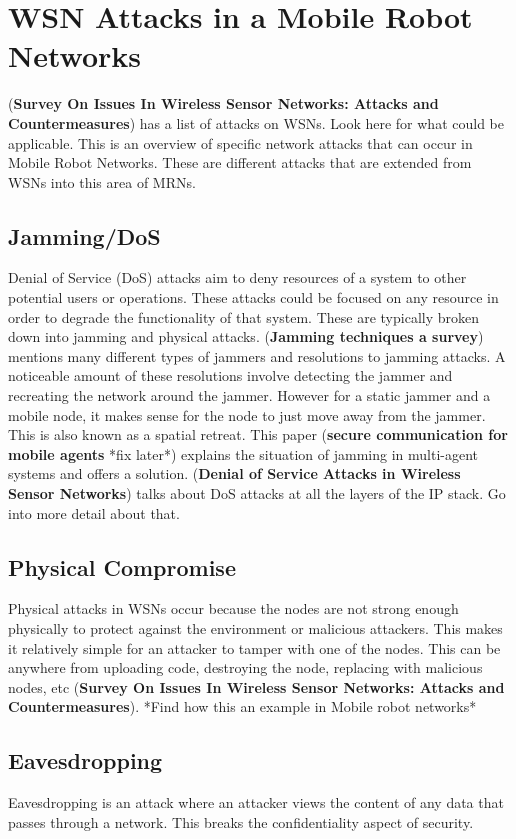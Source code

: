 \section{WSN Attacks in a Mobile Robot Networks}
(\textbf{Survey On Issues In Wireless Sensor Networks: Attacks and Countermeasures}) has a list of attacks on WSNs. Look here for what could be applicable. \newline
This is an overview of specific network attacks that can occur in Mobile Robot Networks. These are different attacks that are extended from WSNs into this area of MRNs.  
\subsection{Jamming/DoS}
Denial of Service (DoS) attacks aim to deny resources of a system to other potential users or operations. These attacks could be focused on any resource in order to degrade the functionality of that system. These are typically broken down into jamming and physical attacks. \newline
(\textbf{Jamming techniques a survey}) mentions many different types of jammers and resolutions to jamming attacks. A noticeable amount of these resolutions involve detecting the jammer and recreating the network around the jammer. However for a static jammer and a mobile node, it makes sense for the node to just move away from the jammer. This is also known as a spatial retreat. This paper (\textbf{secure communication for mobile agents} *fix later*) explains the situation of jamming in multi-agent systems and offers a solution. \newline
(\textbf{Denial of Service Attacks in Wireless Sensor Networks}) talks about DoS attacks at all the layers of the IP stack. Go into more detail about that. 
\subsection{Physical Compromise}
Physical attacks in WSNs occur because the nodes are not strong enough physically to protect against the environment or malicious attackers. This makes it relatively simple for an attacker to tamper with one of the nodes. This can be anywhere from uploading code, destroying the node, replacing with malicious nodes, etc (\textbf{Survey On Issues In Wireless Sensor Networks: Attacks and Countermeasures}). *Find how this an example in Mobile robot networks* 
\subsection{Eavesdropping}
Eavesdropping is an attack where an attacker views the content of any data that passes through a network. This breaks the confidentiality aspect of security. 
